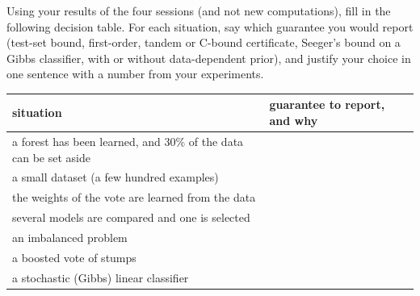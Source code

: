 \documentclass[11pt]{article}
\begin{document}
Using your results of the four sessions (and not new computations), fill in the following decision table. For
each situation, say which guarantee you would report (test-set bound, first-order, tandem or C-bound certificate,
Seeger's bound on a Gibbs classifier, with or without data-dependent prior), and justify your choice in one sentence
with a number from your experiments.
\begin{center}\small
\renewcommand{\arraystretch}{2}
\begin{tabular}{p{7.2cm}p{6.2cm}}
\toprule
situation & guarantee to report, and why \\
\midrule
a forest has been learned, and $30\%$ of the data can be set aside & \\
a small dataset (a few hundred examples) & \\
the weights of the vote are learned from the data & \\
several models are compared and one is selected & \\
an imbalanced problem & \\
a boosted vote of stumps & \\
a stochastic (Gibbs) linear classifier & \\
\bottomrule
\end{tabular}
\end{center}
\end{document}
